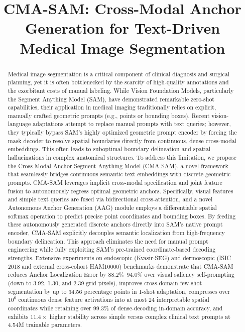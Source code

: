 \documentclass[onecolumn]{IEEEtran}
\numberwithin{equation}{section}
\theoremstyle{definition}
\theoremstyle{remark}
\begin{document}
\title{CMA-SAM: Cross-Modal Anchor Generation for Text-Driven Medical Image Segmentation}

\maketitle

\begin{abstract}
Medical image segmentation is a critical component of clinical diagnosis and surgical planning, yet it is often bottlenecked by the scarcity of high-quality annotations and the exorbitant costs of manual labeling. While Vision Foundation Models, particularly the Segment Anything Model (SAM), have demonstrated remarkable zero-shot capabilities, their application in medical imaging traditionally relies on explicit, manually crafted geometric prompts (e.g., points or bounding boxes). Recent vision-language adaptations attempt to replace manual prompts with text queries; however, they typically bypass SAM's highly optimized geometric prompt encoder by forcing the mask decoder to resolve spatial boundaries directly from continuous, dense cross-modal embeddings. This often leads to suboptimal boundary delineation and spatial hallucinations in complex anatomical structures. To address this limitation, we propose the Cross-Modal Anchor Segment Anything Model (CMA-SAM), a novel framework that seamlessly bridges continuous semantic text embeddings with discrete geometric prompts. CMA-SAM leverages implicit cross-modal specification and joint feature fusion to autonomously regress optimal geometric anchors. Specifically, visual features and simple text queries are fused via bidirectional cross-attention, and a novel Autonomous Anchor Generation (AAG) module employs a differentiable spatial softmax operation to predict precise point coordinates and bounding boxes. By feeding these autonomously generated discrete anchors directly into SAM's native prompt encoder, CMA-SAM explicitly decouples semantic localization from high-frequency boundary delineation. This approach eliminates the need for manual prompt engineering while fully exploiting SAM's pre-trained coordinate-based decoding strengths. Extensive experiments on endoscopic (Kvasir-SEG) and dermoscopic (ISIC 2018 and external cross-cohort HAM10000) benchmarks demonstrate that CMA-SAM reduces Anchor Localization Error by 88.2\%--94.0\% over visual saliency self-prompting (down to 3.92, 1.30, and 2.39 grid pixels), improves cross-domain few-shot segmentation by up to 34.56 percentage points in 1-shot adaptation, compresses over $10^6$ continuous dense feature activations into at most 24 interpretable spatial coordinates while retaining over 99.3\% of dense-decoding in-domain accuracy, and exhibits $11.4\times$ higher stability across simple versus complex clinical text prompts at 4.54M trainable parameters.
\end{abstract}
\end{document}
